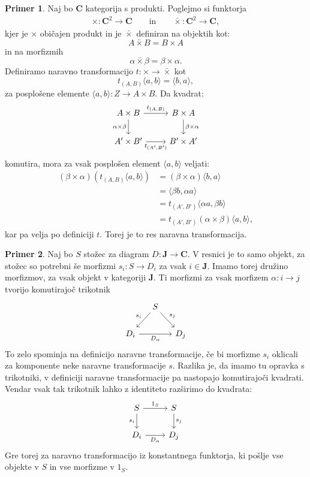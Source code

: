 \documentclass[12pt,a4paper]{book}
\theoremstyle{definition}
\theoremstyle{plain}
\theoremstyle{definition}
\newtheorem{primer}{Primer}[section]
\theoremstyle{remark}
\newcommand{\cat}[1]{\textbf{#1}}
\begin{document}
\begin{primer}
Naj bo \cat{C} kategorija s produkti. Poglejmo si funktorja
\begin{align*}
\times : \cat{C}^2 \to \cat{C} \qquad \text{in} \qquad \bar{\times} : \cat{C}^2 \to \cat{C},
\end{align*}
kjer je $\times$ običajen produkt in je $\bar{\times}$ definiran na objektih kot:
$$ A \bar{\times} B = B \times A$$
in na morfizmih
$$ \alpha \bar{\times} \beta = \beta \times \alpha.$$
Definiramo naravno transformacijo $t : \times \to \bar{\times}$ kot
$$t_{(A,B)}\langle a,b \rangle = \langle b,a \rangle,$$
za posplošene elemente $\langle a,b \rangle : Z \to A \times B$. Da kvadrat:
$$ \begin{tikzcd}
A \times B \ar[d, "\alpha \times \beta"'] \ar[r, "t_{(A,B)}"] & B \times A \ar[d, "\beta \times \alpha"] \\
A' \times B' \ar[r, "t_{(A',B')}"'] & B' \times A'
\end{tikzcd} $$
komutira, mora za vsak posplošen element $\langle a,b \rangle$ veljati:
\begin{align*}
(\beta \times \alpha)(t_{(A,B)}\langle a,b \rangle ) &= (\beta \times \alpha)\langle b,a \rangle \\
& = \langle \beta b,\alpha a \rangle \\
& = t_{(A',B')}\langle \alpha a, \beta b \rangle \\
& = t_{(A', B')}(\alpha \times \beta)\langle a,b \rangle,
\end{align*}
kar pa velja po definiciji $t$. Torej je to res naravna transformacija.
\end{primer}

\begin{primer}
Naj bo $S$ stožec za diagram $D : \cat{J} \to \cat{C}$. V resnici je to samo objekt, za stožec so potrebni še morfizmi $s_i : S \to D_i$ za vsak $i \in \cat{J}$. Imamo torej družino morfizmov, za vsak objekt v kategoriji $\cat{J}$. Ti morfizmi za vsak morfizem $\alpha : i \to j$ tvorijo komutirajoč trikotnik
$$ \begin{tikzcd} [column sep=small]
& S \ar[dl, "s_i"'] \ar[dr, "s_j"] & \\
D_i \ar[rr, "D_\alpha"'] & & D_j
\end{tikzcd} $$
To zelo spominja na definicijo naravne transformacije, če bi morfizme $s_i$ oklicali za komponente neke naravne transformacije $s$. Razlika je, da imamo tu opravka s trikotniki, v definiciji naravne transformacije pa nastopajo komutirajoči kvadrati. Vendar vsak tak trikotnik lahko z identiteto razširimo do kvadrata:
$$ \begin{tikzcd}
S \ar[d, "s_i"'] \ar[r, "1_S"] & S \ar[d, "s_j"]\\
D_i \ar[r, "D_\alpha"'] & D_j
\end{tikzcd} $$
Gre torej za naravno transformacijo iz konstantnega funktorja, ki pošlje vse objekte v $S$ in vse morfizme v $1_S$.

\end{primer}
\end{document}
